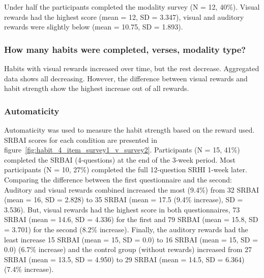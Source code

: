 \documentclass{scaffold/sigchi}
\begin{document}
Under half the participants completed the modality survey (N = 12, 40\%). Visual rewards had the highest score (mean = 12, SD = 3.347), visual and auditory rewards were slightly below (mean = 10.75, SD = 1.893).

\subsubsection{How many habits were completed, verses, modality type?}
Habits with visual rewards increased over time, but the rest decrease. Aggregated data shows all decreasing. However, the difference between visual rewards and habit strength show the highest increase out of all rewards.


\subsubsection{Automaticity}
Automaticity was used to measure the habit strength based on the reward used. SRBAI scores for each condition are presented in figure~\ref{fig:habit_4_item_survey1_v_survey2}.
Participants (N = 15, 41\%) completed the SRBAI (4-questions) at the end of the 3-week period. Most participants (N = 10, 27\%) completed the full 12-question SRHI 1-week later. Comparing the difference between the first questionnaire and the second: Auditory and visual rewards combined increased the most (9.4\%) from 32 SRBAI (mean = 16, SD = 2.828) to 35 SRBAI (mean = 17.5 (9.4\% increase), SD = 3.536). But, visual rewards had the highest score in both questionnaires, 73 SRBAI (mean = 14.6, SD = 4.336) for the first and 79 SRBAI (mean = 15.8, SD = 3.701) for the second (8.2\% increase). Finally, the auditory rewards had the least increase 15 SRBAI (mean = 15, SD = 0.0) to 16 SRBAI (mean = 15, SD = 0.0) (6.7\% increase) and the control group (without rewards) increased from 27 SRBAI (mean = 13.5, SD = 4.950) to 29 SRBAI (mean = 14.5, SD = 6.364) (7.4\% increase).

\end{document}
